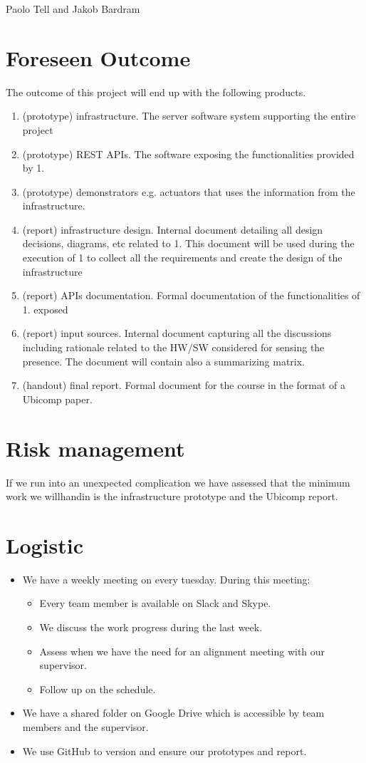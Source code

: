 \documentclass{sigchi}
\begin{document}
Paolo Tell and Jakob Bardram

\section{Foreseen Outcome}

The outcome of this project will end up with the following products.
\begin{enumerate}
\item (prototype) infrastructure. The server software system supporting the entire project
\item (prototype) REST APIs. The software exposing the functionalities provided by 1.
\item (prototype) demonstrators e.g. actuators that uses the information from the infrastructure.
\item (report) infrastructure design. Internal document detailing all design decisions, diagrams, etc related to 1. This document will be used during the execution of 1 to collect all the requirements and create the design of the infrastructure
\item (report) APIs documentation. Formal documentation of the functionalities of 1. exposed
\item (report) input sources. Internal document capturing all the discussions including rationale related to the HW/SW considered for sensing the presence.  The document will contain also a summarizing matrix.
\item (handout) final report. Formal document for the course in the format of a Ubicomp paper.
\end{enumerate}

\section{Risk management}

If we run into an unexpected complication we have assessed that the minimum work we willhandin is the infrastructure prototype and the Ubicomp report.

\section{Logistic}

\begin{itemize}
\item We have a weekly meeting on every tuesday. During this meeting:
    \begin{itemize}
    \item Every team member is available on Slack and Skype.
    \item We discuss the work progress during the last week.
    \item Assess when we have the need for an alignment meeting with our supervisor.
    \item Follow up on the schedule.
    \end{itemize}
\item We have a shared folder on Google Drive which is accessible by team members and the supervisor.
\item We use GitHub to version and ensure our prototypes and report.
\end{itemize}
\end{document}

